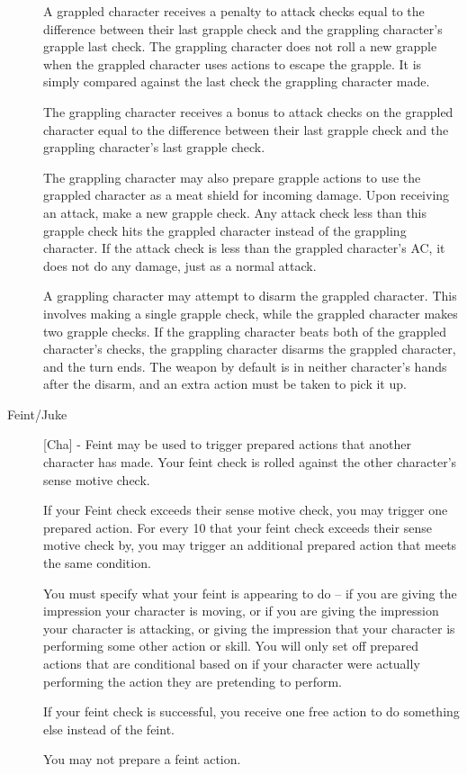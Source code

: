 \begin{description}
A grappled character receives a penalty to attack checks equal to the difference between their last grapple check and the grappling character’s grapple last check. The grappling character does not roll a new grapple when the grappled character uses actions to escape the grapple. It is simply compared against the last check the grappling character made.

The grappling character receives a bonus to attack checks on the grappled character equal to the difference between their last grapple check and the grappling character’s last grapple check.

The grappling character may also prepare grapple actions to use the grappled character as a meat shield for incoming damage. Upon receiving an attack, make a new grapple check. Any attack check less than this grapple check hits the grappled character instead of the grappling character. If the attack check is less than the grappled character's AC, it does not do any damage, just as a normal attack.

A grappling character may attempt to disarm the grappled character. This involves making a single grapple check, while the grappled character makes two grapple checks. If the grappling character beats both of the grappled character's checks, the grappling character disarms the grappled character, and the turn ends. The weapon by default is in neither character's hands after the disarm, and an extra action must be taken to pick it up.

\item[Feint/Juke] [Cha] - Feint may be used to trigger prepared actions that another character has made. Your feint check is rolled against the other character’s sense motive check.

If your Feint check exceeds their sense motive check, you may trigger one prepared action. For every 10 that your feint check exceeds their sense motive check by, you may trigger an additional prepared action that meets the same condition.

You must specify what your feint is appearing to do – if you are giving the impression your character is moving, or if you are giving the impression your character is attacking, or giving the impression that your character is performing some other action or skill. You will only set off prepared actions that are conditional based on if your character were actually performing the action they are pretending to perform.

If your feint check is successful, you receive one free action to do something else instead of the feint.

You may not prepare a feint action.
\end{description}